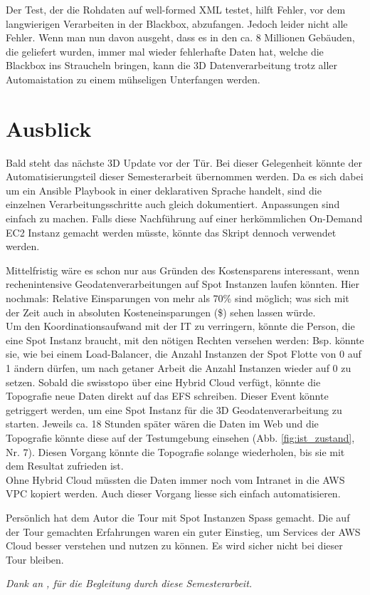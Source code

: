 Der Test, der die Rohdaten auf well-formed XML testet, hilft Fehler, vor dem langwierigen Verarbeiten in der Blackbox, abzufangen. Jedoch leider nicht alle Fehler. Wenn man nun davon ausgeht, dass es in den ca. 8 Millionen Gebäuden, die geliefert wurden, immer mal wieder fehlerhafte Daten hat, welche die Blackbox ins Straucheln bringen, kann die 3D Datenverarbeitung trotz aller Automaistation zu einem mühseligen Unterfangen werden.

\section{Ausblick}
Bald steht das nächste 3D Update vor der Tür. Bei dieser Gelegenheit könnte der Automatisierungsteil dieser Semesterarbeit übernommen werden. Da es sich dabei um ein Ansible Playbook in einer deklarativen Sprache handelt, sind die einzelnen Verarbeitungsschritte auch gleich dokumentiert. Anpassungen sind einfach zu machen. Falls diese Nachführung auf einer herkömmlichen On-Demand EC2 Instanz gemacht werden müsste, könnte das Skript dennoch verwendet werden.

Mittelfristig wäre es schon nur aus Gründen des Kostensparens interessant, wenn rechenintensive Geodatenverarbeitungen auf Spot Instanzen laufen könnten. Hier nochmals: Relative Einsparungen von mehr als 70\% sind möglich; was sich mit der Zeit auch in absoluten Kosteneinsparungen (\$) sehen lassen würde.\\ Um den Koordinationsaufwand mit der IT zu verringern, könnte die Person, die eine Spot Instanz braucht, mit den nötigen Rechten versehen werden: Bsp. könnte sie, wie bei einem Load-Balancer, die Anzahl Instanzen der Spot Flotte von 0 auf 1 ändern dürfen, um nach getaner Arbeit die Anzahl Instanzen wieder auf 0 zu setzen.
Sobald die swisstopo über eine Hybrid Cloud verfügt, könnte die Topografie neue Daten direkt auf das EFS schreiben. Dieser Event könnte getriggert werden, um eine Spot Instanz für die 3D Geodatenverarbeitung zu starten. Jeweils ca. 18 Stunden später wären die Daten im Web und die Topografie könnte diese auf der Testumgebung einsehen (Abb. \ref{fig:ist_zustand}, Nr. 7). Diesen Vorgang könnte die Topografie solange wiederholen, bis sie mit dem Resultat zufrieden ist.\\Ohne Hybrid Cloud müssten die Daten immer noch vom Intranet in die AWS VPC kopiert werden. Auch dieser Vorgang liesse sich einfach automatisieren.

Persönlich hat dem Autor die Tour mit Spot Instanzen Spass gemacht. Die auf der Tour gemachten Erfahrungen waren ein guter Einstieg, um Services der AWS Cloud besser verstehen und nutzen zu können. Es wird sicher nicht bei dieser Tour bleiben.

\vspace{4cm}
\textit{Dank an \prof, für die Begleitung durch diese Semesterarbeit.}

